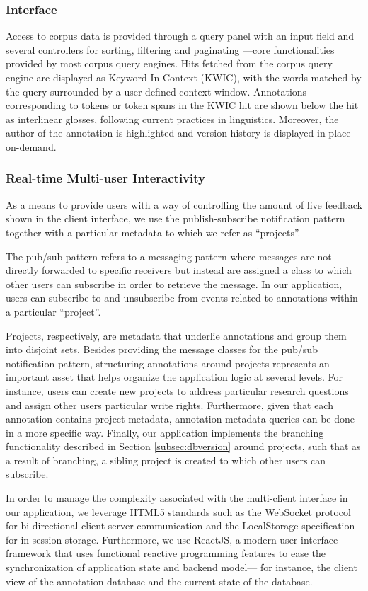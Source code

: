 \documentclass{sig-alternate}
\begin{document}
\subsubsection{Interface}
Access to corpus data is provided through a query panel with an input field and several
controllers for sorting, filtering and paginating ---core functionalities provided by
most corpus query engines. Hits fetched from the corpus query engine are displayed as Keyword
In Context (KWIC), with the words matched by the query surrounded by a user defined context window.
Annotations corresponding to tokens or token spans in the KWIC hit are shown below the hit as
interlinear glosses, following current practices in linguistics. 
Moreover, the author of the annotation is highlighted and version history is displayed in place
on-demand.

\subsubsection{Real-time Multi-user Interactivity}
As a means to provide users with a way of controlling the amount of live feedback shown in the
client interface, we use the publish-subscribe notification pattern together with a particular
metadata to which we refer as ``projects''.

The pub/sub pattern refers to a messaging pattern where messages are not directly forwarded to
specific receivers but instead are assigned a class to which other users can subscribe in order to
retrieve the message. In our application, users can subscribe to and unsubscribe from events related
to annotations within a particular ``project''.

Projects, respectively, are metadata that underlie annotations and group them into disjoint sets.
Besides providing the message classes for the pub/sub notification pattern, structuring annotations
around projects represents an important asset that helps organize the application logic at
several levels. For instance, users can create new projects to address particular research questions
and assign other users particular write rights. Furthermore, given that each annotation contains
project metadata, annotation metadata queries can be done in a more specific way.
Finally, our application implements the branching functionality described in Section
\ref{subsec:dbversion} around projects, such that as a result of branching, a sibling project is
created to which other users can subscribe.

In order to manage the complexity associated with the multi-client interface in our application,
we leverage HTML5 standards such as the WebSocket protocol for bi-directional client-server
communication and the LocalStorage specification for in-session storage. Furthermore, we use
ReactJS, a modern user interface framework that uses functional reactive programming features to
ease the synchronization of application state and backend model--- for instance, the
client view of the annotation database and the current state of the database.
\end{document}
